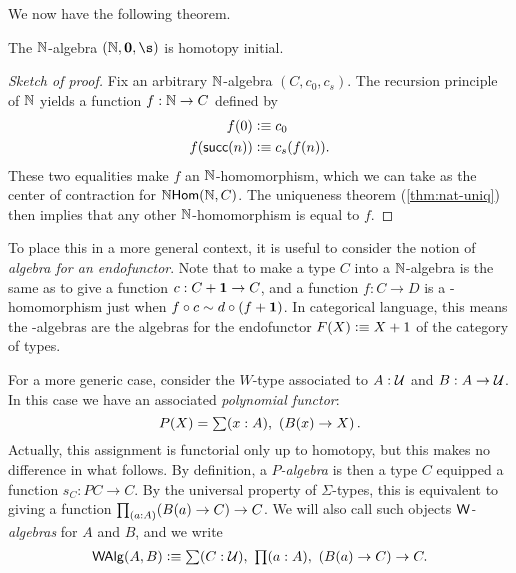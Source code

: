 We now have the following theorem.

\begin{thm}\label{thm:nat-hinitial}
The $\mathbb{N}$-algebra $(\nat, \zero, \s)$ is homotopy initial.
\end{thm}
\begin{proof}[Sketch of proof]
  Fix an arbitrary $\mathbb{N}$-algebra $(C,c_0,c_s)$.
  The recursion principle of $\mathbb{N}$ yields a function $f:\mathbb{N}\to C$ defined by
  \begin{align*}
    f(0) &\vcentcolon\equiv c_0\\
    f(\mathsf{succ}(n)) &\vcentcolon\equiv c_s(f(n)).
  \end{align*}
  These two equalities make $f$ an $\mathbb{N}$-homomorphism, which we can take as the center of contraction for $\mathsf{\mathbb{N} Hom}(\mathbb{N},C)$.
  The uniqueness theorem (\autoref{thm:nat-uniq}) then implies that any other $\mathbb{N}$-homomorphism is equal to $f$.
\end{proof}

To place this in a more general context, it is useful to consider the notion of \emph{algebra for an endofunctor}.
Note that to make a type $C$ into a $\mathbb{N}$-algebra is the same as to give a function $c:C+\mathbf{1}\to C$, and a function $f:C\to D$ is a \nat-homomorphism just when $f \circ c \sim d \circ (f+\mathbf{1})$.
In categorical language, this means the \nat-algebras are the algebras for the endofunctor $F(X)\vcentcolon\equiv X+1$ of the category of types.

For a more generic case, consider the $W$-type associated to $A : \mathcal{U}$ and $B : A \to \mathcal{U}$.
In this case we have an associated \emph{polynomial functor}: 
\begin{equation}
\label{eq:polyfunc}
P(X) = \sm{x : A} (B(x) \rightarrow X) \, .
\end{equation}
Actually, this assignment is functorial only up to homotopy, but this makes no difference in what follows.
By definition, a \emph{$P$-algebra} is then a type $C$ equipped a function $s_C :  PC \rightarrow C$.
By the universal property of $\Sigma$-types, this is equivalent to giving a function $\prd{a:A} (B(a) \to C) \to C$.
We will also call such objects \emph{$\mathsf{W}$-algebras} for $A$ and $B$, and we write
\begin{align*}
\walg(A,B) \defeq \sm {C : \type} \prd{a:A} (B(a) \to C) \to C.
\end{align*}

